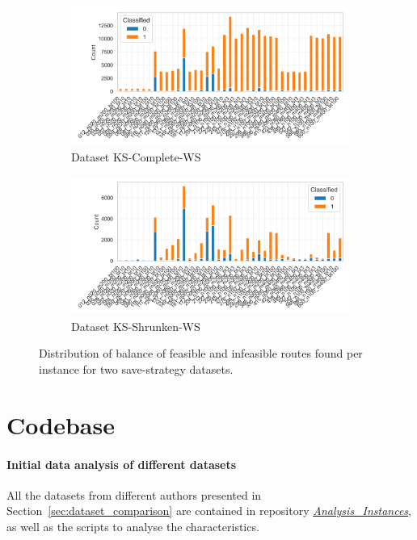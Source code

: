 \begin{figure}[!ht]
	\centering
	\begin{subfigure}[t]{.5\textwidth}
		\centering
		\includegraphics[width=\linewidth]{pictures/dataset_structure/distribution_plot_krebs_28880_600_WS.png}
		\caption{Dataset KS-Complete-WS}
		\label{fig:ds-a-krebs_x}
	\end{subfigure}%
	\begin{subfigure}[t]{.5\textwidth}
		\centering
		\includegraphics[width=\linewidth]{pictures/dataset_structure/distribution_plot_krebs_28880_600_WS_Shrinked094.png}
		\caption{Dataset KS-Shrunken-WS}
		\label{fig:ds-b-krebs_l}
	\end{subfigure}
	\caption{Distribution of balance of feasible and infeasible routes found per \krebsADataSetText instance for two save-strategy datasets.}
	\label{fig:route-feasibility_save_krebs}
\end{figure}

\clearpage
\chapter{Codebase}
\label{app:sec:github_implementations}

\subsubsection{Initial data analysis of different datasets}
All the datasets from different authors presented in Section~\ref{sec:dataset_comparison} are contained in repository
\href{https://github.com/MxHbm/Analysis_Instances}{\textit{Analysis\_Instances}}, as well as the scripts to analyse the characteristics.

